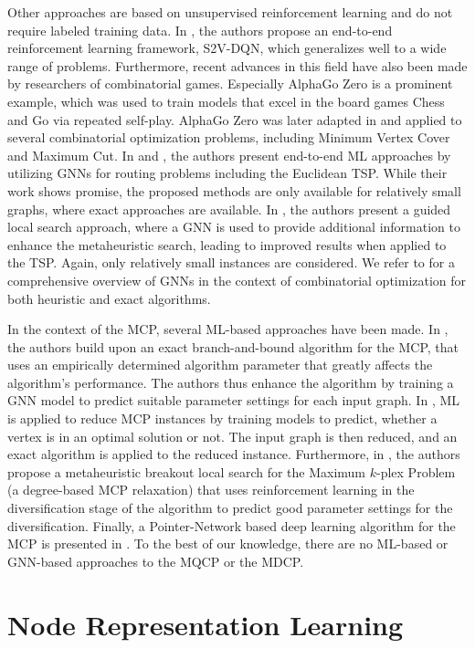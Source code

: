 \documentclass[draft,final]{vutinfth} %
\begin{document}
Other approaches are based on unsupervised reinforcement learning and do not require labeled training data. 
In \cite{Khalil2017}, the authors propose an end-to-end reinforcement learning framework, S2V-DQN, which generalizes well to a wide range of problems. 
Furthermore, recent advances in this field have also been made by researchers of combinatorial games. Especially AlphaGo Zero is a prominent example, which was used to train models that excel in the board games Chess and Go via repeated self-play. AlphaGo Zero was later adapted in \cite{Abe2019} and applied to several combinatorial optimization problems, including Minimum Vertex Cover and Maximum Cut. 
In \cite{Kool2019} and \cite{Joshi2021}, the authors present end-to-end ML approaches by utilizing GNNs for routing problems including the Euclidean TSP. While their work shows promise, the proposed methods are only available for relatively small graphs, where exact approaches are available. In \cite{Hudson2021}, the authors present a guided local search approach, where a GNN is used to provide additional information to enhance the metaheuristic search, leading to improved results when applied to the TSP. Again, only relatively small instances are considered. 
We refer to \cite{Cappart2021} for a comprehensive overview of GNNs in the context of combinatorial optimization for both heuristic and exact algorithms. 

In the context of the MCP, several ML-based approaches have been made. In \cite{Kristjan2022}, the authors build upon an exact branch-and-bound algorithm for the MCP, that uses an empirically determined algorithm parameter that greatly affects the algorithm's performance. The authors thus enhance the algorithm by training a GNN model to predict suitable parameter settings for each input graph. 
In \cite{Sun2021}, ML is applied to reduce MCP instances by training models to predict, whether a vertex is in an optimal solution or not. The input graph is then reduced, and an exact algorithm is applied to the reduced instance. 
Furthermore, in \cite{Yan2022}, the authors propose a metaheuristic breakout local search for the Maximum $k$-plex Problem (a degree-based MCP relaxation) that uses reinforcement learning in the diversification stage of the algorithm to predict good parameter settings for the diversification. Finally, a Pointer-Network based deep learning algorithm for the MCP is presented in \cite{Gu2020}. 
To the best of our knowledge, there are no ML-based or GNN-based approaches to the MQCP or the MDCP. 

\section{Node Representation Learning}\label{sec:node-representation}
\end{document}
